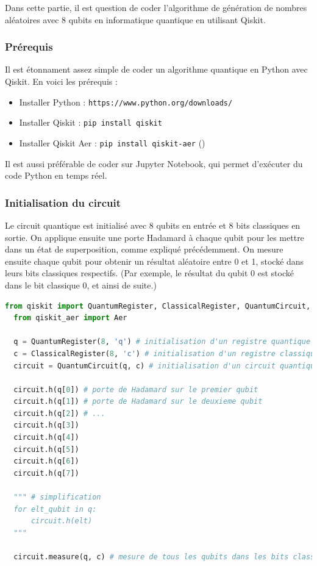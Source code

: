 \documentclass{article}
\begin{document}
Dans cette partie, il est question de coder l'algorithme de génération de nombres aléatoires avec 8 qubits en informatique quantique en utilisant Qiskit.

\subsubsection{Prérequis}
Il est étonnament assez simple de coder un algorithme quantique en Python avec Qiskit. En voici les prérequis :

\begin{itemize}
  \item Installer Python : \texttt{https://www.python.org/downloads/}
  \item Installer Qiskit : \texttt{pip install qiskit}
  \item Installer Qiskit Aer : \texttt{pip install qiskit-aer} (\cite{qiskitGettingStarted})
\end{itemize}

Il est aussi préférable de coder sur Jupyter Notebook, qui permet d'exécuter du code Python en temps réel.

\subsubsection{Initialisation du circuit}

Le circuit quantique est initialisé avec 8 qubits en entrée et 8 bits classiques en sortie. On applique ensuite une porte Hadamard à chaque qubit pour les mettre dans un état de superposition, comme expliqué précédemment.
On mesure ensuite chaque qubit pour obtenir un résultat aléatoire entre 0 et 1, stocké dans leurs bits classiques respectifs. (Par exemple, le résultat du qubit 0 est stocké dans le bit classique 0, et ainsi de suite.)

\begin{lstlisting}[language=Python, style=mystyle, caption={Initialisation du circuit avec 8 qubits}]
  from qiskit import QuantumRegister, ClassicalRegister, QuantumCircuit, transpile
  from qiskit_aer import Aer
  
  q = QuantumRegister(8, 'q') # initialisation d'un registre quantique de 8 qubits
  c = ClassicalRegister(8, 'c') # initialisation d'un registre classique de 8 bits
  circuit = QuantumCircuit(q, c) # initialisation d'un circuit quantique avec les registres q et c
  
  circuit.h(q[0]) # porte de Hadamard sur le premier qubit
  circuit.h(q[1]) # porte de Hadamard sur le deuxieme qubit
  circuit.h(q[2]) # ...
  circuit.h(q[3])
  circuit.h(q[4])
  circuit.h(q[5])
  circuit.h(q[6])
  circuit.h(q[7])

  """ # simplification
  for elt_qubit in q:
      circuit.h(elt)
  """
  
  circuit.measure(q, c) # mesure de tous les qubits dans les bits classiques correspondants
\end{lstlisting}
\end{document}
